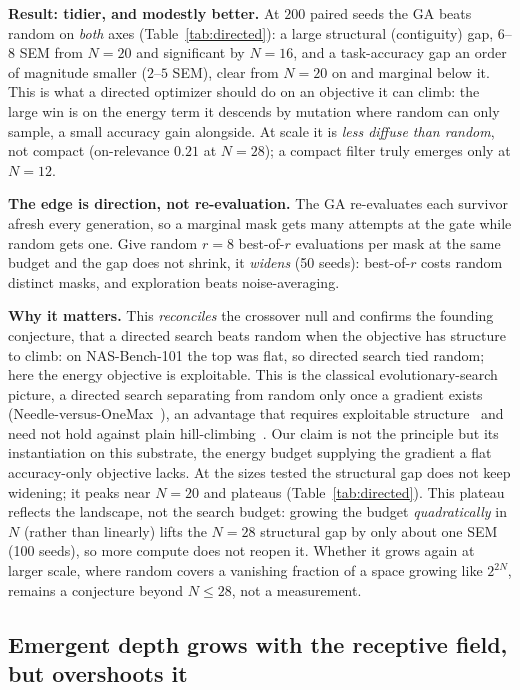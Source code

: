 \documentclass[11pt]{article}
\begin{document}
\textbf{Result: tidier, and modestly better.} At $200$ paired seeds the GA beats random on \emph{both} axes
(Table~\ref{tab:directed}): a large structural (contiguity) gap, $6$--$8$ SEM from $N{=}20$ and significant
by $N{=}16$, and a task-accuracy gap an order of magnitude smaller ($2$--$5$ SEM), clear from $N{=}20$ on
and marginal below it.
This is what a directed optimizer should do on an objective it can climb: the large win is on the energy term
it descends by mutation where random can only sample, a small accuracy gain alongside. At scale it is
\emph{less diffuse than random}, not compact (on-relevance $0.21$ at $N{=}28$); a compact filter truly emerges
only at $N{=}12$.

\textbf{The edge is direction, not re-evaluation.} The GA re-evaluates each survivor afresh every generation,
so a marginal mask gets many attempts at the gate while random gets one. Give random $r{=}8$ best-of-$r$
evaluations per mask at the same budget and the gap does not shrink, it \emph{widens} (50 seeds): best-of-$r$
costs random distinct masks, and exploration beats noise-averaging.

\textbf{Why it matters.} This \emph{reconciles} the crossover null and confirms the founding conjecture,
that a directed search beats random when the objective has structure to climb: on NAS-Bench-101 the top was
flat, so directed search tied random; here the energy objective is exploitable. This is the classical
evolutionary-search picture, a directed search separating from random only once a gradient exists
(Needle-versus-OneMax~\cite{djw2002}), an advantage that requires exploitable structure~\cite{nfl,fdc} and
need not hold against plain hill-climbing~\cite{royalroad}. Our claim is not the principle but its instantiation on this
substrate, the energy budget supplying the gradient a flat accuracy-only objective lacks. At the sizes tested the structural gap does not keep widening; it peaks near
$N{=}20$ and plateaus (Table~\ref{tab:directed}). This plateau reflects the landscape, not the search budget:
growing the budget \emph{quadratically} in $N$ (rather than linearly) lifts the $N{=}28$ structural gap by
only about one SEM (100 seeds), so more compute does not reopen it. Whether it grows again at larger scale,
where random covers a vanishing fraction of a space growing like $2^{2N}$, remains a conjecture beyond
$N{\le}28$, not a measurement.

\subsection{Emergent depth grows with the receptive field, but overshoots it}
\end{document}
